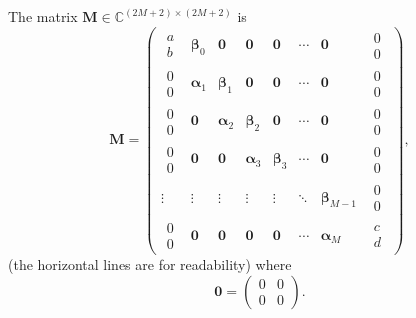 \documentclass[]{article}
\begin{document}
	The matrix $\mathbf{M}\in\mathbb{C}^{(2M+2)\times(2M+2)}$ is 
	\begin{equation}
		\mathbf{M}=
		\begin{pmatrix}
			\begin{matrix}a\\b\end{matrix}&\bm{\beta}_0&\bm{0}&\mathbf{0}&\mathbf{0}&\cdots&\mathbf{0}&\begin{matrix}0\\0\end{matrix}\\
			\hline
			\begin{matrix}0\\0\end{matrix}&\bm{\alpha}_1&\bm{\beta}_1&\mathbf{0}&\mathbf{0}&\cdots&\mathbf{0}&\begin{matrix}0\\0\end{matrix}\\
			\hline 
			\begin{matrix}0\\0\end{matrix}&\mathbf{0}&\bm{\alpha}_2&\bm{\beta}_2&\mathbf{0}&\cdots&\mathbf{0}&\begin{matrix}0\\0\end{matrix}\\
			\hline
			\begin{matrix}0\\0\end{matrix}&\mathbf{0}&\mathbf{0}&\bm{\alpha}_3&\bm{\beta}_3&\cdots&\mathbf{0}&\begin{matrix}0\\0\end{matrix}\\
			\hline
			\vdots&\vdots&\vdots&\vdots&\vdots&\ddots&\bm{\beta}_{M-1}&\begin{matrix}0\\0\end{matrix}\\
			\hline
			\begin{matrix}0\\0\end{matrix}&\mathbf{0}&\mathbf{0}&\mathbf{0}&\mathbf{0}&\cdots&\bm{\alpha}_{M}&\begin{matrix}c\\d\end{matrix}
		\end{pmatrix},
	\end{equation}
	(the horizontal lines are for readability) where 
	\begin{equation}
		\mathbf{0}=\begin{pmatrix}0&0\\0&0\end{pmatrix}.
	\end{equation}
\end{document}
